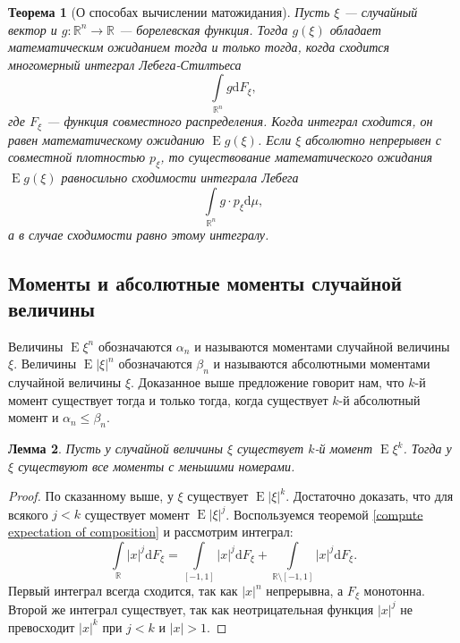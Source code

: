 \documentclass[12pt]{article}
\newtheorem{theorem}{Теорема}
\newtheorem{lemma}[theorem]{Лемма}
\numberwithin{theorem}{section}
\theoremstyle{definition}
\newcommand{\defin}[2]{\hypertarget{#2}{{\color{red} #1}}}
\newcommand{\RR}{\mathbb{R}}
\newcommand{\expect}{\operatorname{E}}
\newcommand{\diff}{\mathrm{d}}
\begin{document}
	\begin{theorem}[О способах вычислении матожидания] \label{compute expectation of vector}
		Пусть $ \xi $ --- случайный вектор и $ g \colon \RR^n \to \RR $ --- борелевская функция.
		Тогда $ g(\xi) $ обладает математическим ожиданием тогда и только тогда,
		когда сходится многомерный интеграл Лебега-Стилтьеса
		$$ \int\limits_{\RR^n} g\diff F_{\xi}, $$
		где $ F_\xi $ --- функция совместного распределения.
		Когда интеграл сходится, он равен математическому ожиданию $ \expect g(\xi) $.
		Если $ \xi $ абсолютно непрерывен с совместной плотностью $ p_\xi $,
		то существование математического ожидания $ \expect g(\xi) $ равносильно сходимости интеграла Лебега
		$$ \int\limits_{\RR^n} g \cdot p_\xi\diff \mu, $$
		а в случае сходимости равно этому интегралу.
	\end{theorem}
	
	\subsection{Моменты и абсолютные моменты случайной величины}
	
	Величины $ \expect\xi^n $ обозначаются $ \alpha_n $ и называются \defin{моментами случайной величины $ \xi $}{moment}.
	Величины $ \expect|\xi|^n $ обозначаются $ \beta_n $ и называются \defin{абсолютными моментами случайной величины $ \xi $}{absolute-moment}.
	Доказанное выше предложение говорит нам, что $ k $-й момент существует тогда и только тогда,
	когда существует $ k $-й абсолютный момент и $ \alpha_n \leqslant \beta_n $.
	
	\begin{lemma}
		Пусть у случайной величины $ \xi $ существует $ k $-й момент $ \expect\xi^k $.
		Тогда у $ \xi $ существуют все моменты с меньшими номерами.
	\end{lemma}
	
	\begin{proof}
		По сказанному выше, у $ \xi $ существует $ \expect|\xi|^k $.
		Достаточно доказать, что для всякого $ j < k $ существует момент $ \expect|\xi|^j $.
		Воспользуемся теоремой \ref{compute expectation of composition}
		и рассмотрим интеграл:
		$$ \int\limits_{\RR} |x|^j\diff F_\xi = \int\limits_{[-1, 1]} |x|^j\diff F_\xi
		+ \int\limits_{\RR \setminus [-1, 1]} |x|^j\diff F_\xi. $$
		Первый интеграл всегда сходится, так как $ |x|^n $ непрерывна, а $ F_\xi $ монотонна.
		Второй же интеграл существует, так как неотрицательная функция $ |x|^j $ не превосходит $ |x|^k $
		при $ j < k $ и $ |x| > 1 $.
	\end{proof}
\end{document}

